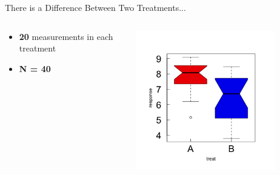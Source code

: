 \documentclass{beamer}
\begin{document}
\begin{frame}{There is a Difference Between Two Treatments...}
  \begin{columns}[onlytextwidth] %
    \begin{column}{0.44\textwidth}
      \begin{itemize}
        \item \textbf{20} measurements in each treatment
        \item \textbf{N = 40}
      \end{itemize}
    \end{column}
    \hspace{0.02\textwidth} %
    \begin{column}{0.6\textwidth}
      \begin{center}
        \includegraphics[width=0.8\textwidth]{lectures/day_1_intro_to_mems/figures/unnamed-chunk-5-1.png}
      \end{center}
    \end{column}
  \end{columns}

    

\end{frame}
\end{document}
